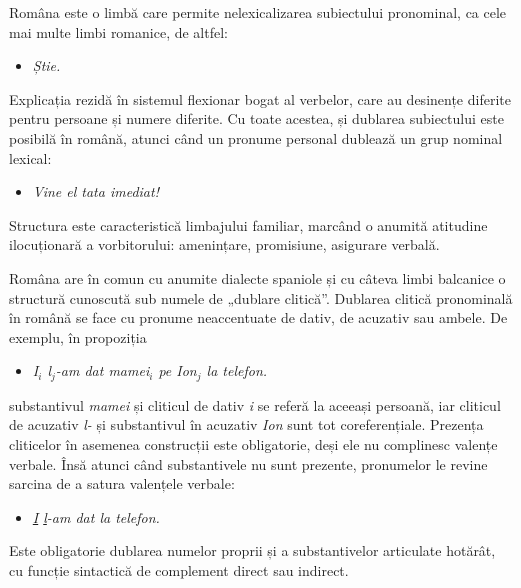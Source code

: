 \begin{multicols}{2}
Româna este o limbă care permite nelexicalizarea subiectului pronominal, ca cele mai multe limbi romanice, de altfel: 

\begin{itemize}
\item \textit{Știe.}
\end{itemize}

Explicația rezidă în sistemul flexionar bogat al verbelor, care au desinențe diferite pentru persoane și numere diferite.
Cu toate acestea, și dublarea subiectului este posibilă în română, atunci când un pronume personal dublează un grup nominal lexical:

\begin{itemize}
\item\textit{Vine el tata imediat!}
\end{itemize}

Structura este caracteristică limbajului familiar, marcând o anumită atitudine ilocuționară a vorbitorului: amenințare, promisiune, asigurare verbală.

Româna are în comun cu anumite dialecte spaniole și cu câteva limbi balcanice o structură cunoscută sub numele de „dublare clitică”. Dublarea clitică pronominală în română se face cu pronume neaccentuate de dativ, de acuzativ sau ambele. De exemplu, în propoziția 

\begin{itemize}
\item\textit{I$_{i}$ l$_{j}$-am dat mamei$_{i}$ pe Ion$_{j}$ la telefon.}
\end{itemize}

substantivul \textit{mamei} și cliticul de dativ \textit{i} se referă la aceeași persoană, iar cliticul de acuzativ \textit{l-} și substantivul în acuzativ \textit{Ion} sunt tot coreferențiale. Prezența cliticelor în asemenea construcții este obligatorie, deși ele nu complinesc valențe verbale. Însă atunci când substantivele nu sunt prezente, pronumelor le revine sarcina de a satura valențele verbale:

\begin{itemize}
\item\textit{\underline{I} \underline{l}-am dat la telefon.}
\end{itemize}

Este obligatorie dublarea numelor proprii și a substantivelor articulate hotărât, cu funcție sintactică de complement direct sau indirect. 



\end{multicols}
